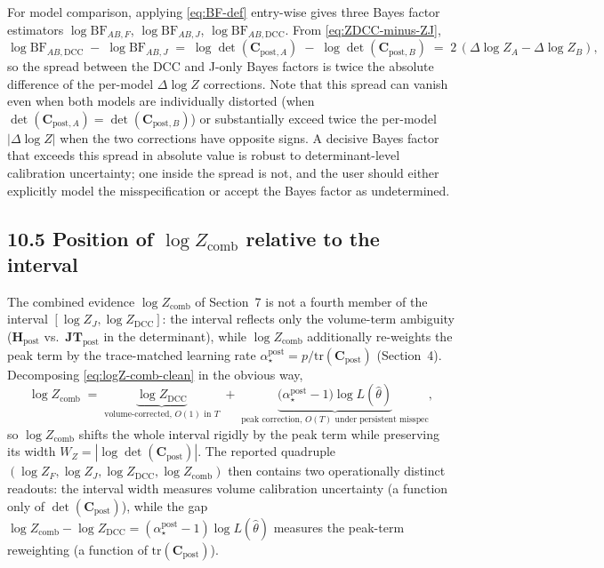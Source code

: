\documentclass[11pt]{article}
\begin{document}
For model comparison, applying \eqref{eq:BF-def} entry-wise gives three Bayes factor
estimators $\log\mathrm{BF}_{AB,F}$, $\log\mathrm{BF}_{AB,J}$, $\log\mathrm{BF}_{AB,\mathrm{DCC}}$.
From \eqref{eq:ZDCC-minus-ZJ},
\begin{equation}
\log\mathrm{BF}_{AB,\mathrm{DCC}}
\;-\;
\log\mathrm{BF}_{AB,J}
\;=\;
\log\det(\mathbf C_{\mathrm{post},A})
\;-\;
\log\det(\mathbf C_{\mathrm{post},B})
\;=\;
2\,(\Delta\log Z_A - \Delta\log Z_B),
\label{eq:BF-interval}
\end{equation}
so the spread between the DCC and J-only Bayes factors is twice the absolute difference
of the per-model $\Delta\log Z$ corrections. Note that this spread can vanish even when
both models are individually distorted (when $\det(\mathbf C_{\mathrm{post},A}) = \det(\mathbf C_{\mathrm{post},B})$)
or substantially exceed twice the per-model $|\Delta\log Z|$ when the two corrections have
opposite signs. A decisive Bayes factor that exceeds this spread in absolute value is
robust to determinant-level calibration uncertainty; one inside the spread is not, and the
user should either explicitly model the misspecification or accept the Bayes factor as
undetermined.

\subsection*{10.5 Position of $\log Z_{\mathrm{comb}}$ relative to the interval}

The combined evidence $\log Z_{\mathrm{comb}}$ of Section~7 is not a fourth member
of the interval $[\log Z_J,\log Z_{\mathrm{DCC}}]$: the interval reflects only the
volume-term ambiguity ($\mathbf H_{\mathrm{post}}$ vs.\ $\mathbf{JT}_{\mathrm{post}}$
in the determinant), while $\log Z_{\mathrm{comb}}$ additionally re-weights the peak
term by the trace-matched learning rate
$\alpha_\star^{\mathrm{post}} = p/\mathrm{tr}(\mathbf C_{\mathrm{post}})$
(Section~4). Decomposing \eqref{eq:logZ-comb-clean} in the obvious way,
\begin{equation}
\log Z_{\mathrm{comb}}
\;=\;
\underbrace{\log Z_{\mathrm{DCC}}}_{\text{volume-corrected, }O(1)\text{ in }T}
\;+\;
\underbrace{\bigl(\alpha_\star^{\mathrm{post}}-1\bigr)\log L(\hat\theta)}_{\text{peak correction, }O(T)\text{ under persistent misspec}},
\label{eq:logZcomb-vs-interval}
\end{equation}
so $\log Z_{\mathrm{comb}}$ shifts the whole interval rigidly by the peak term while
preserving its width $W_Z = |\log\det(\mathbf C_{\mathrm{post}})|$. The reported
quadruple $(\log Z_F,\log Z_J,\log Z_{\mathrm{DCC}},\log Z_{\mathrm{comb}})$ then
contains two operationally distinct readouts: the interval width measures volume
calibration uncertainty (a function only of $\det(\mathbf C_{\mathrm{post}})$),
while the gap
$\log Z_{\mathrm{comb}} - \log Z_{\mathrm{DCC}} = (\alpha_\star^{\mathrm{post}}-1)\log L(\hat\theta)$
measures the peak-term reweighting (a function of $\mathrm{tr}(\mathbf C_{\mathrm{post}})$).
\end{document}
